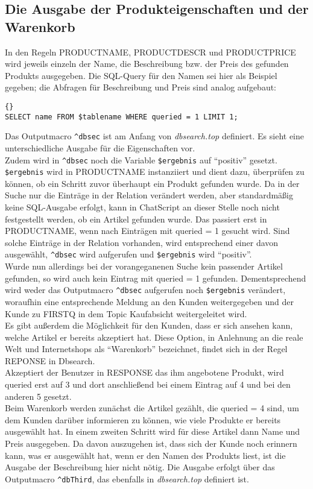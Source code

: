 \subsection{Die Ausgabe der Produkteigenschaften und der Warenkorb}
\label{sec:AusgabeWarenkorb}

In den Regeln PRODUCTNAME, PRODUCTDESCR und PRODUCTPRICE wird jeweils einzeln der Name, die Beschreibung bzw. der Preis des gefunden Produkts ausgegeben. Die SQL-Query für den Namen sei hier als Beispiel gegeben; die Abfragen für Beschreibung und Preis sind analog aufgebaut:
\begin{lstlisting}{}
SELECT name FROM $tablename WHERE queried = 1 LIMIT 1;
\end{lstlisting}
Das Outputmacro \lstinline|^dbsec| ist am Anfang von \textit{dbsearch.top} definiert. Es sieht eine unterschiedliche Ausgabe für die Eigenschaften vor.\\
Zudem wird in \lstinline|^dbsec| noch die Variable \lstinline|$ergebnis| auf "`positiv"' gesetzt. \lstinline|$ergebnis| wird in PRODUCTNAME instanziiert und dient dazu, überprüfen zu können, ob ein Schritt zuvor überhaupt ein Produkt gefunden wurde. Da in der Suche nur die Einträge in der Relation verändert werden, aber standardmäßig keine SQL-Ausgabe erfolgt, kann in ChatScript an dieser Stelle noch nicht festgestellt werden, ob ein Artikel gefunden wurde. Das passiert erst in PRODUCTNAME, wenn nach Einträgen mit queried = 1 gesucht wird. Sind solche Einträge in der Relation vorhanden, wird entsprechend einer davon ausgewählt, \lstinline|^dbsec| wird aufgerufen und \lstinline|$ergebnis| wird "`positiv"'.\\
Wurde nun  allerdings bei der vorangeganenen Suche kein passender Artikel gefunden, so wird auch kein Eintrag mit queried = 1 gefunden. Dementsprechend wird weder das Outputmacro \lstinline|^dbsec| aufgerufen noch \lstinline|$ergebnis| verändert, woraufhin eine entsprechende Meldung an den Kunden weitergegeben und der Kunde zu FIRSTQ in dem Topic Kaufabsicht weitergeleitet wird.\\
Es gibt außerdem die Möglichkeit für den Kunden, dass er sich ansehen kann, welche Artikel er bereits akzeptiert hat. Diese Option, in Anlehnung an die reale Welt und Internetshops als "`Warenkorb"' bezeichnet, findet sich in der Regel REPONSE in Dbsearch.\\
Akzeptiert der Benutzer in RESPONSE das ihm angebotene Produkt, wird queried erst auf 3 und dort anschließend bei einem Eintrag auf 4 und bei den anderen 5 gesetzt.\\
Beim Warenkorb werden zunächst die Artikel gezählt, die queried = 4 sind, um dem Kunden darüber informieren zu können, wie viele Produkte er bereits ausgewählt hat. In einem zweiten Schritt wird für diese Artikel dann Name und Preis ausgegeben. Da davon auszugehen ist, dass sich der Kunde noch erinnern kann, was er ausgewählt hat, wenn er den Namen des Produkts liest, ist die Ausgabe der Beschreibung hier nicht nötig. Die Ausgabe erfolgt über das Outputmacro \lstinline|^dbThird|, das ebenfalls in \textit{dbsearch.top} definiert ist.


